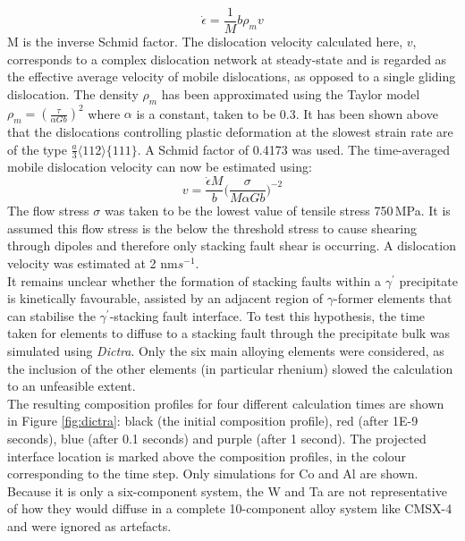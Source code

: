 \documentclass[a4paper,12pt,times,numbered,print,index]{Classes/PhDThesisPSnPDF}
\begin{document}
\begin{equation}
\dot{\epsilon} = \frac{1}{M}b\rho_{m}v
\label{eqn:orowan}
\end{equation}
M is the inverse Schmid factor. The dislocation velocity calculated here, $v$, corresponds to a complex dislocation network at steady-state and is regarded as the effective average velocity of mobile dislocations, as opposed to a single gliding dislocation. The density $\rho_{m}$ has been approximated using the Taylor model $\rho_{m}=(\frac{\tau}{\alpha Gb})^2$ where $\alpha$ is a constant, taken to be 0.3.\citep{} It has been shown above that the dislocations controlling plastic deformation at the slowest strain rate are of the type $\frac{a}{3}$$\langle112\rangle$$ \{111\}$. A Schmid factor of 0.4173 was used. The time-averaged mobile dislocation velocity can now be estimated using:
\begin{equation}
v = \frac{\dot{\epsilon}M}{b}\Big( \frac{\sigma}{M\alpha Gb} \Big) ^{-2}
\label{eqn:dislv}
\end{equation}
The flow stress $\sigma$ was taken to be the lowest value of tensile stress 750\,MPa. It is assumed this flow stress is the below the threshold stress to cause shearing through dipoles and therefore only stacking fault shear is occurring. A dislocation velocity was estimated at 2 nm$s^{-1}$.\\
It remains unclear whether the formation of stacking faults within a $\gamma^\prime$ precipitate is kinetically favourable, assisted by an adjacent region of $\gamma$-former elements that can stabilise the $\gamma^\prime$-stacking fault interface. To test this hypothesis, the time taken for elements to diffuse to a stacking fault through the precipitate bulk was simulated using \textit{Dictra}. Only the six main alloying elements were considered, as the inclusion of the other elements (in particular rhenium) slowed the calculation to an unfeasible extent.\\
The resulting composition profiles for four different calculation times are shown in Figure \ref{fig:dictra}: black (the initial composition profile), red (after 1E-9 seconds), blue (after 0.1 seconds) and purple (after 1 second). The projected interface location is marked above the composition profiles, in the colour corresponding to the time step. Only simulations for Co and Al are shown. Because it is only a six-component system, the W and Ta are not representative of how they would diffuse in a complete 10-component alloy system like CMSX-4 and were ignored as artefacts.\\
\end{document}
